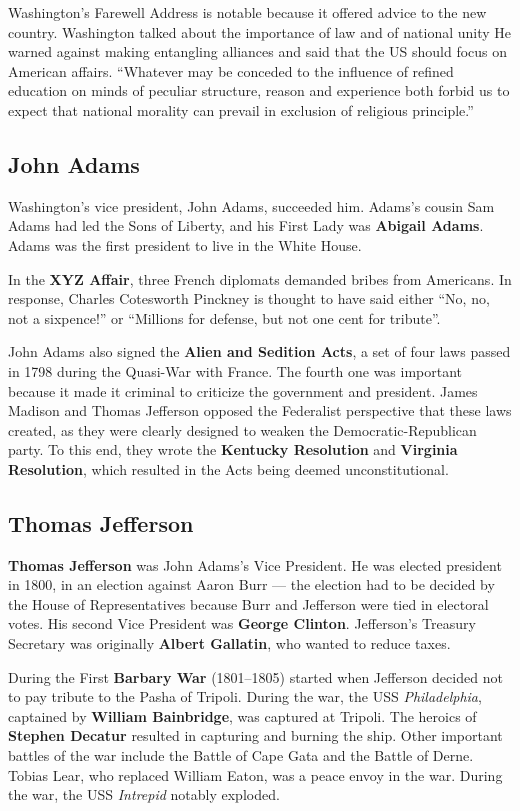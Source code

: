 Washington's Farewell Address is notable because it offered advice to the new country.
Washington talked about the importance of law and of national unity
He warned against making entangling alliances and said that the US should focus on American affairs.
``Whatever may be conceded to the influence of refined education on minds of peculiar structure,
reason and experience both forbid us to expect that national morality
can prevail in exclusion of religious principle.''

\subsection*{John Adams}

Washington's vice president, John Adams, succeeded him.
Adams's cousin Sam Adams had led the Sons of Liberty,
and his First Lady was \textbf{Abigail Adams}.
Adams was the first president to live in the White House.

In the \textbf{XYZ Affair}, three French diplomats demanded bribes from Americans.
In response, Charles Cotesworth Pinckney is thought to have said either
``No, no, not a sixpence!'' or ``Millions for defense, but not one cent for tribute''.

John Adams also signed the \textbf{Alien and Sedition Acts},
a set of four laws passed in 1798 during the Quasi-War with France.
The fourth one was important because it made it criminal to criticize the government and president.
James Madison and Thomas Jefferson opposed the Federalist perspective that these laws created,
as they were clearly designed to weaken the Democratic-Republican party.
To this end, they wrote the \textbf{Kentucky Resolution} and \textbf{Virginia Resolution},
which resulted in the Acts being deemed unconstitutional.

\subsection*{Thomas Jefferson}

\textbf{Thomas Jefferson} was John Adams's Vice President.
He was elected president in 1800, in an election against Aaron Burr ---
the election had to be decided by the House of Representatives
because Burr and Jefferson were tied in electoral votes.
His second Vice President was \textbf{George Clinton}.
Jefferson's Treasury Secretary was originally \textbf{Albert Gallatin}, who wanted to reduce taxes.

During the First \textbf{Barbary War} (1801--1805)
started when Jefferson decided not to pay tribute to the Pasha of Tripoli.
During the war, the USS \textit{Philadelphia}, captained by \textbf{William Bainbridge}, was captured at Tripoli.
The heroics of \textbf{Stephen Decatur} resulted in capturing and burning the ship.
Other important battles of the war include the Battle of Cape Gata and the Battle of Derne.
Tobias Lear, who replaced William Eaton, was a peace envoy in the war.
During the war, the USS \textit{Intrepid} notably exploded.

